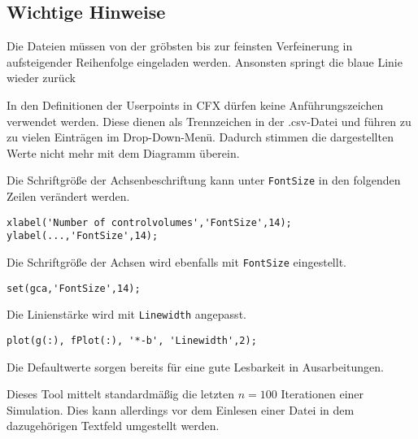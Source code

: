 \subsection{Wichtige Hinweise}
\lstset{language=Matlab}
\begin{description}
\item Die Dateien müssen von der gröbsten bis zur feinsten Verfeinerung in aufsteigender Reihenfolge eingeladen werden. Ansonsten springt die blaue Linie wieder zurück
\item In den Definitionen der Userpoints in CFX dürfen keine Anführungszeichen verwendet werden. Diese dienen als Trennzeichen in der .csv-Datei und führen zu zu vielen Einträgen im Drop-Down-Menü. Dadurch stimmen die dargestellten Werte nicht mehr mit dem Diagramm überein.
\item Die Schriftgröße der Achsenbeschriftung kann unter \texttt{FontSize} in den folgenden Zeilen verändert werden.
\begin{lstlisting}[frame=single]
xlabel('Number of controlvolumes','FontSize',14);
ylabel(...,'FontSize',14);
\end{lstlisting}
\item Die Schriftgröße der Achsen wird ebenfalls mit \texttt{FontSize} eingestellt.
\begin{lstlisting}[frame=single]
set(gca,'FontSize',14);
\end{lstlisting}
\item Die Linienstärke wird  mit \texttt{Linewidth} angepasst.
\begin{lstlisting}[frame=single]
plot(g(:), fPlot(:), '*-b', 'Linewidth',2);
\end{lstlisting}
\item Die Defaultwerte sorgen bereits für eine gute Lesbarkeit in Ausarbeitungen.
\item Dieses Tool mittelt standardmäßig die letzten $n=100$ Iterationen einer Simulation. Dies kann allerdings vor dem Einlesen einer Datei in dem dazugehörigen Textfeld umgestellt werden. 
\end{description}

